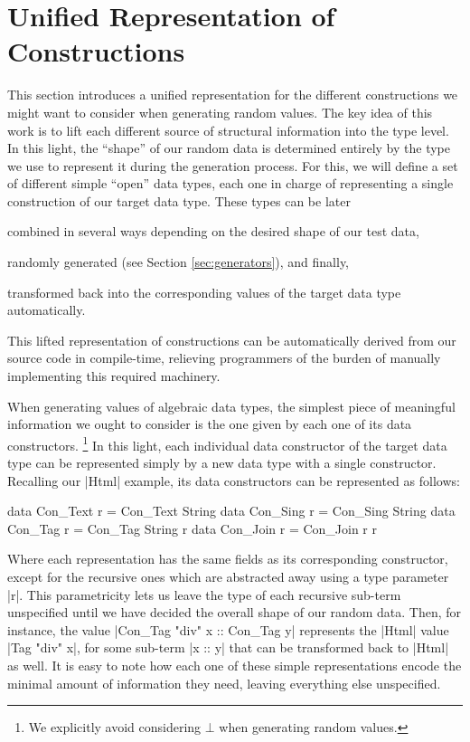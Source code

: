 \section{Unified Representation of Constructions}
\label{sec:representation}

%
This section introduces a unified representation for the different constructions
we might want to consider when generating random values.
%
The key idea of this work is to lift each different source of structural
information into the type level.
%
In this light, the ``shape'' of our random data is determined entirely by
the type we use to represent it during the generation process.
%
For this, we will define a set of different simple ``open'' data types,
each one in charge of representing a single construction of our target data
type.
%
These types can be later
\begin{inparaenum}[(i)]
\item combined in several ways depending on the desired shape of our test data,
\item randomly generated (see Section \ref{sec:generators}), and finally,
\item transformed back into the corresponding values of the target data type
  automatically.
\end{inparaenum}
%
This lifted representation of constructions can be automatically derived from
our source code in compile-time, relieving programmers of the burden of manually
implementing this required machinery.


%
When generating values of algebraic data types, the simplest piece of meaningful
information we ought to consider is the one given by each one of its data
constructors.
%
\footnote{We explicitly avoid considering $\bot$ when generating random values.}
%
In this light, each individual data constructor of the target data type can be
represented simply by a new data type with a single constructor.
%
Recalling our |Html| example, its data constructors can be represented as
follows:

\begin{code}
data Con_Text   r = Con_Text  String
data Con_Sing   r = Con_Sing  String
data Con_Tag    r = Con_Tag   String r
data Con_Join   r = Con_Join  r r
\end{code}

Where each representation has the same fields as its corresponding constructor,
except for the recursive ones which are abstracted away using a type parameter
|r|.
%
This parametricity lets us leave the type of each recursive sub-term unspecified
until we have decided the overall shape of our random data.
%
Then, for instance, the value |Con_Tag "div" x :: Con_Tag y| represents the
|Html| value |Tag "div" x|, for some sub-term |x :: y| that can be transformed
back to |Html| as well.
%
It is easy to note how each one of these simple representations encode the
minimal amount of information they need, leaving everything else unspecified.

